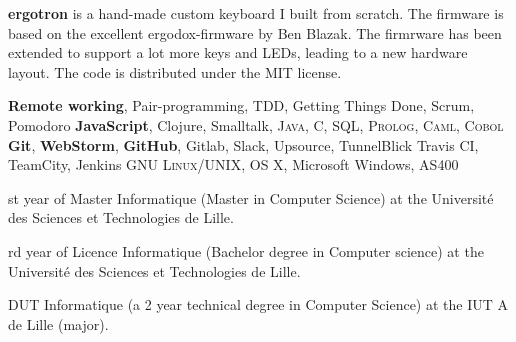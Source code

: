 \begin{rubric}{
}
 \textbf{ergotron} is a hand-made custom keyboard I built from scratch. The firmware is based on the excellent ergodox-firmware by Ben Blazak. The firmrware has been extended to support a lot more keys and LEDs, leading to a new hardware layout. The code is distributed under the MIT license.


\entry*[Agile] \textbf{Remote working}, Pair-programming, TDD, Getting Things Done, Scrum, Pomodoro
\entry*[Programming] \textbf{JavaScript}, Clojure, Smalltalk, \textsc{Java}, C, \textsc{SQL}, \textsc{Prolog}, \textsc{Caml}, \textsc{Cobol}
\entry*[Software] \textbf{Git}, \textbf{WebStorm}, \textbf{GitHub}, Gitlab, Slack, Upsource, TunnelBlick
 Travis CI, TeamCity, Jenkins
\entry*[System] \textsc{GNU Linux/UNIX}, OS X, Microsoft Windows, AS400

\textup{st} year of Master Informatique (Master in Computer Science) at the Université des Sciences et Technologies de Lille.

\textup{rd} year of Licence Informatique (Bachelor degree in Computer science) at the Université des Sciences et Technologies de Lille.

\entry*[2009 - 2011]
DUT Informatique (a 2 year technical degree in Computer Science)  at the IUT A de Lille (major).


\end{rubric}
